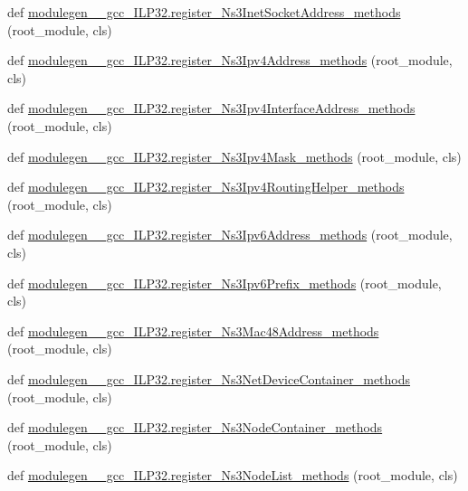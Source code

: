 \begin{DoxyCompactItemize}
\item 
def \hyperlink{namespacemodulegen____gcc__ILP32_af47db5c9e5891cce492509429be285fb}{modulegen\+\_\+\+\_\+gcc\+\_\+\+I\+L\+P32.\+register\+\_\+\+Ns3\+Inet\+Socket\+Address\+\_\+methods} (root\+\_\+module, cls)
\item 
def \hyperlink{namespacemodulegen____gcc__ILP32_a3a069cad6e59687195ff869fd35923d3}{modulegen\+\_\+\+\_\+gcc\+\_\+\+I\+L\+P32.\+register\+\_\+\+Ns3\+Ipv4\+Address\+\_\+methods} (root\+\_\+module, cls)
\item 
def \hyperlink{namespacemodulegen____gcc__ILP32_a09d0dfb1bfe3187cde56d7bf5232394f}{modulegen\+\_\+\+\_\+gcc\+\_\+\+I\+L\+P32.\+register\+\_\+\+Ns3\+Ipv4\+Interface\+Address\+\_\+methods} (root\+\_\+module, cls)
\item 
def \hyperlink{namespacemodulegen____gcc__ILP32_a4f3623d807ca57aa642b7e9d784b1747}{modulegen\+\_\+\+\_\+gcc\+\_\+\+I\+L\+P32.\+register\+\_\+\+Ns3\+Ipv4\+Mask\+\_\+methods} (root\+\_\+module, cls)
\item 
def \hyperlink{namespacemodulegen____gcc__ILP32_ab5bdc0e2ef22c998c26c2fcd841241bf}{modulegen\+\_\+\+\_\+gcc\+\_\+\+I\+L\+P32.\+register\+\_\+\+Ns3\+Ipv4\+Routing\+Helper\+\_\+methods} (root\+\_\+module, cls)
\item 
def \hyperlink{namespacemodulegen____gcc__ILP32_acc57372433d228dd060a3165e8c17c71}{modulegen\+\_\+\+\_\+gcc\+\_\+\+I\+L\+P32.\+register\+\_\+\+Ns3\+Ipv6\+Address\+\_\+methods} (root\+\_\+module, cls)
\item 
def \hyperlink{namespacemodulegen____gcc__ILP32_aa8595c3a98eeb16457cb2bea21656ecd}{modulegen\+\_\+\+\_\+gcc\+\_\+\+I\+L\+P32.\+register\+\_\+\+Ns3\+Ipv6\+Prefix\+\_\+methods} (root\+\_\+module, cls)
\item 
def \hyperlink{namespacemodulegen____gcc__ILP32_a8e21fcb75de80cc6b1cd32abe7cfdd36}{modulegen\+\_\+\+\_\+gcc\+\_\+\+I\+L\+P32.\+register\+\_\+\+Ns3\+Mac48\+Address\+\_\+methods} (root\+\_\+module, cls)
\item 
def \hyperlink{namespacemodulegen____gcc__ILP32_aa9b79a6cfb60163ed439b9298fb5c7d7}{modulegen\+\_\+\+\_\+gcc\+\_\+\+I\+L\+P32.\+register\+\_\+\+Ns3\+Net\+Device\+Container\+\_\+methods} (root\+\_\+module, cls)
\item 
def \hyperlink{namespacemodulegen____gcc__ILP32_a29b309b6bee1fe59273ea5b33c29fde1}{modulegen\+\_\+\+\_\+gcc\+\_\+\+I\+L\+P32.\+register\+\_\+\+Ns3\+Node\+Container\+\_\+methods} (root\+\_\+module, cls)
\item 
def \hyperlink{namespacemodulegen____gcc__ILP32_a3489751a1b1d8427351041e15fa4b685}{modulegen\+\_\+\+\_\+gcc\+\_\+\+I\+L\+P32.\+register\+\_\+\+Ns3\+Node\+List\+\_\+methods} (root\+\_\+module, cls)

\end{DoxyCompactItemize}
